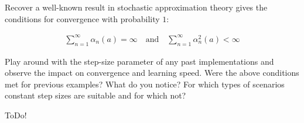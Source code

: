 
\begin{exercise}

Recover a well-known result in stochastic approximation theory gives the conditions for convergence with probability $1$:

\begin{align*}
    \sum_{n=1}^\infty \alpha_n(a) = \infty
    \quad
    \text{and}
    \quad
    \sum_{n=1}^\infty \alpha_n^2(a) < \infty
\end{align*}

Play around with the step-size parameter of any past implementations and observe the impact on convergence and learning speed.
Were the above conditions met for previous examples? What do you notice?
For which types of scenarios constant step sizes are suitable and for which not?

\end{exercise}


\begin{solution}

ToDo!

\end{solution}

